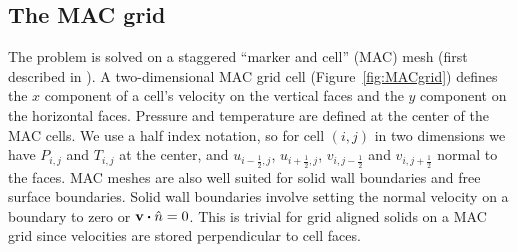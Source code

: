 \documentclass[a4paper,10pt]{scrartcl}
\begin{document}
\subsection{The MAC grid \label{sec:MACgrid}}
The problem is solved on a staggered ``marker and cell'' (MAC) mesh (first described in \cite{harlow1965numerical}). A two-dimensional MAC grid cell (Figure~\ref{fig:MACgrid}) defines the $x$ component of a cell's velocity on the vertical faces and the $y$ component on the horizontal faces. Pressure and temperature are defined at the center of the MAC cells. We use a half index notation, so for cell $(i,j)$ in two dimensions we have $P_{i,j}$ and $T_{i,j}$ at the center, and $u_{i-\frac{1}{2},j}$, $u_{i+\frac{1}{2},j}$, $v_{i,j-\frac{1}{2}}$ and $v_{i,j+\frac{1}{2}}$ normal to the faces. MAC meshes are also well suited for solid wall boundaries and free surface boundaries. Solid wall boundaries involve setting the normal velocity on a boundary to zero or $\vb{v}\vdot\hat{n} = 0$. This is trivial for grid aligned solids on a MAC grid since velocities are stored perpendicular to cell faces.
\end{document}
